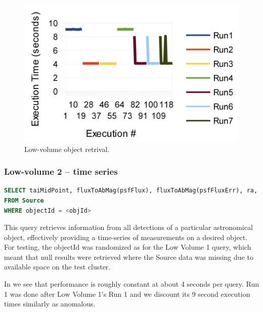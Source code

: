 \documentclass[DM,toc]{lsstdoc}
\begin{document}
\begin{figure}[H]
\centering
\includegraphics{_static/150_node_low_vol_object_retrieval}
\caption{Low-volume object retrival.}
\label{fig:150-node-low-vol-object-retrieval}
\end{figure}

\subsubsection{Low-volume 2 -- time series}\label{low-volume-2-time-series}

\begin{lstlisting}[language=SQL]
SELECT taiMidPoint, fluxToAbMag(psfFlux), fluxToAbMag(psfFluxErr), ra, decl
FROM Source
WHERE objectId = <objId>
\end{lstlisting}

This query retrieves information from all detections of a particular
astronomical object, effectively providing a time-series of measurements
on a desired object. For testing, the objectId was randomized as for the
Low Volume 1 query, which meant that null results were retrieved where
the Source data was missing due to available space on the test cluster.

In  we see that performance is roughly
constant at about 4 seconds per query. Run 1 was done after Low Volume
1's Run 1 and we discount its 9 second execution times similarly as
anomalous.
\end{document}
